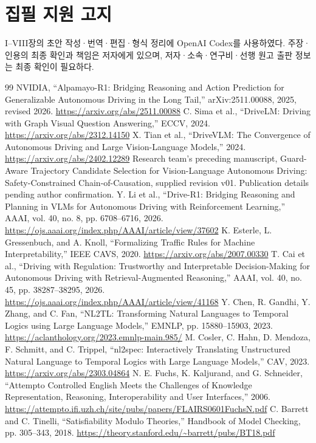 \documentclass[10pt,a4paper,twocolumn]{article}\usepackage[margin=18mm]{geometry}\usepackage{fontspec,kotex}
\begin{document}
\section*{집필 지원 고지}
I--VIII장의 초안 작성·번역·편집·형식 정리에 OpenAI Codex를 사용하였다. 주장·인용의 최종 확인과 책임은 저자에게 있으며, 저자·소속·연구비·선행 원고 출판 정보는 최종 확인이 필요하다.\cite{r15}
\begin{thebibliography}{99}
 NVIDIA, “Alpamayo-R1: Bridging Reasoning and Action Prediction for Generalizable Autonomous Driving in the Long Tail,” arXiv:2511.00088, 2025, revised 2026. \url{https://arxiv.org/abs/2511.00088}
 C. Sima et al., “DriveLM: Driving with Graph Visual Question Answering,” ECCV, 2024. \url{https://arxiv.org/abs/2312.14150}
 X. Tian et al., “DriveVLM: The Convergence of Autonomous Driving and Large Vision-Language Models,” 2024. \url{https://arxiv.org/abs/2402.12289}
 Research team's preceding manuscript, Guard-Aware Trajectory Candidate Selection for Vision-Language Autonomous Driving: Safety-Constrained Chain-of-Causation, supplied revision v01. Publication details pending author confirmation.
 Y. Li et al., “Drive-R1: Bridging Reasoning and Planning in VLMs for Autonomous Driving with Reinforcement Learning,” AAAI, vol. 40, no. 8, pp. 6708--6716, 2026. \url{https://ojs.aaai.org/index.php/AAAI/article/view/37602}
 K. Esterle, L. Gressenbuch, and A. Knoll, “Formalizing Traffic Rules for Machine Interpretability,” IEEE CAVS, 2020. \url{https://arxiv.org/abs/2007.00330}
 T. Cai et al., “Driving with Regulation: Trustworthy and Interpretable Decision-Making for Autonomous Driving with Retrieval-Augmented Reasoning,” AAAI, vol. 40, no. 45, pp. 38287--38295, 2026. \url{https://ojs.aaai.org/index.php/AAAI/article/view/41168}
 Y. Chen, R. Gandhi, Y. Zhang, and C. Fan, “NL2TL: Transforming Natural Languages to Temporal Logics using Large Language Models,” EMNLP, pp. 15880--15903, 2023. \url{https://aclanthology.org/2023.emnlp-main.985/}
 M. Cosler, C. Hahn, D. Mendoza, F. Schmitt, and C. Trippel, “nl2spec: Interactively Translating Unstructured Natural Language to Temporal Logics with Large Language Models,” CAV, 2023. \url{https://arxiv.org/abs/2303.04864}
 N. E. Fuchs, K. Kaljurand, and G. Schneider, “Attempto Controlled English Meets the Challenges of Knowledge Representation, Reasoning, Interoperability and User Interfaces,” 2006. \url{https://attempto.ifi.uzh.ch/site/pubs/papers/FLAIRS0601FuchsN.pdf}
 C. Barrett and C. Tinelli, “Satisfiability Modulo Theories,” Handbook of Model Checking, pp. 305--343, 2018. \url{https://theory.stanford.edu/~barrett/pubs/BT18.pdf}

\end{thebibliography}
\end{document}
